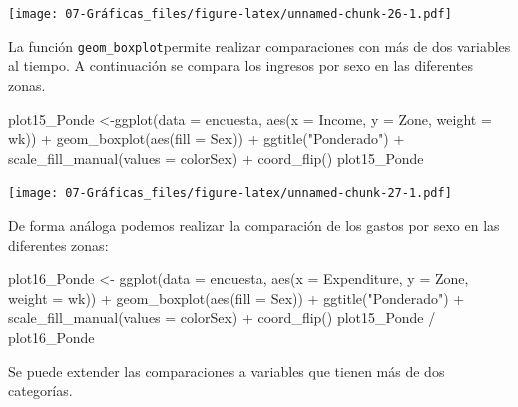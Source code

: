 \documentclass[
  12pt,
]{book}
\newenvironment{Shaded}{\begin{snugshade}}{\end{snugshade}}
\newcommand{\AttributeTok}[1]{\textcolor[rgb]{0.77,0.63,0.00}{#1}}
\newcommand{\FunctionTok}[1]{\textcolor[rgb]{0.00,0.00,0.00}{#1}}
\newcommand{\NormalTok}[1]{#1}
\newcommand{\OtherTok}[1]{\textcolor[rgb]{0.56,0.35,0.01}{#1}}
\newcommand{\SpecialCharTok}[1]{\textcolor[rgb]{0.00,0.00,0.00}{#1}}
\newcommand{\StringTok}[1]{\textcolor[rgb]{0.31,0.60,0.02}{#1}}
\begin{document}
\texttt{[image: 07-Gráficas\_files/figure-latex/unnamed-chunk-26-1.pdf]}

La función \texttt{geom\_boxplot}permite realizar comparaciones con más de dos variables al tiempo. A continuación se compara los ingresos por sexo en las diferentes zonas.

\begin{Shaded}
\begin{Highlighting}[]
\NormalTok{plot15\_Ponde }\OtherTok{\textless{}{-}}\FunctionTok{ggplot}\NormalTok{(}\AttributeTok{data =}\NormalTok{ encuesta,}
    \FunctionTok{aes}\NormalTok{(}\AttributeTok{x =}\NormalTok{ Income, }\AttributeTok{y =}\NormalTok{ Zone, }\AttributeTok{weight =}\NormalTok{ wk)) }\SpecialCharTok{+}
  \FunctionTok{geom\_boxplot}\NormalTok{(}\FunctionTok{aes}\NormalTok{(}\AttributeTok{fill =}\NormalTok{ Sex)) }\SpecialCharTok{+}
  \FunctionTok{ggtitle}\NormalTok{(}\StringTok{"Ponderado"}\NormalTok{) }\SpecialCharTok{+}
  \FunctionTok{scale\_fill\_manual}\NormalTok{(}\AttributeTok{values =}\NormalTok{ colorSex) }\SpecialCharTok{+}
  \FunctionTok{coord\_flip}\NormalTok{()}
\NormalTok{plot15\_Ponde}
\end{Highlighting}
\end{Shaded}

\texttt{[image: 07-Gráficas\_files/figure-latex/unnamed-chunk-27-1.pdf]}

De forma análoga podemos realizar la comparación de los gastos por sexo en las diferentes zonas:

\begin{Shaded}
\begin{Highlighting}[]
\NormalTok{plot16\_Ponde }\OtherTok{\textless{}{-}} \FunctionTok{ggplot}\NormalTok{(}\AttributeTok{data =}\NormalTok{ encuesta,}
    \FunctionTok{aes}\NormalTok{(}\AttributeTok{x =}\NormalTok{ Expenditure, }\AttributeTok{y =}\NormalTok{ Zone, }\AttributeTok{weight =}\NormalTok{ wk)) }\SpecialCharTok{+}
  \FunctionTok{geom\_boxplot}\NormalTok{(}\FunctionTok{aes}\NormalTok{(}\AttributeTok{fill =}\NormalTok{ Sex)) }\SpecialCharTok{+}
  \FunctionTok{ggtitle}\NormalTok{(}\StringTok{"Ponderado"}\NormalTok{) }\SpecialCharTok{+}
  \FunctionTok{scale\_fill\_manual}\NormalTok{(}\AttributeTok{values =}\NormalTok{ colorSex) }\SpecialCharTok{+}
  \FunctionTok{coord\_flip}\NormalTok{()}
\NormalTok{plot15\_Ponde }\SpecialCharTok{/}\NormalTok{ plot16\_Ponde}
\end{Highlighting}
\end{Shaded}

Se puede extender las comparaciones a variables que tienen más de dos categorías.
\end{document}
